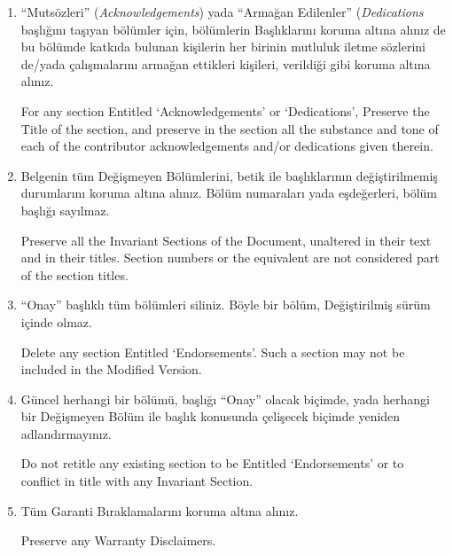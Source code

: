 \begin{multicols}{2}
\begin{enumerate}
\item %
“Mutsözleri” (\emph{Acknowledgements}) yada “Armağan Edilenler” (\emph{Dedications} başlığını taşıyan bölümler için, bölümlerin Başlıklarını koruma altına alınız de bu bölümde katkıda bulunan kişilerin her birinin mutluluk iletme sözlerini de/yada çalışmalarını armağan ettikleri kişileri, verildiği gibi koruma altına alınız.

\begin{ingliz}For any section Entitled
`Acknowledgements' or
`Dedications', Preserve the Title of the
section, and preserve in the section all the substance and
tone of each of the contributor acknowledgements and/or
dedications given therein.\end{ingliz}

\item Belgenin tüm Değişmeyen Bölümlerini, betik ile başlıklarının değiştirilmemiş durumlarını koruma altına alınız. Bölüm numaraları yada eşdeğerleri, bölüm başlığı sayılmaz. 

\begin{ingliz}Preserve all the Invariant Sections of the
Document, unaltered in their text and in their titles.
Section numbers or the equivalent are not considered part
of the section titles.\end{ingliz}        

\item “Onay” başlıklı tüm bölümleri siliniz. Böyle bir bölüm, Değiştirilmiş sürüm içinde olmaz.
\begin{ingliz}Delete any section Entitled
`Endorsements'. Such a section may not be
included in the Modified Version.\end{ingliz}

\item Güncel herhangi bir bölümü, başlığı “Onay” olacak biçimde, yada herhangi bir Değişmeyen Bölüm ile başlık konusunda çelişecek biçimde yeniden adlandırmayınız. 
\begin{ingliz} Do not retitle any existing section to be
Entitled `Endorsements' or to conflict in
title with any Invariant Section.\end{ingliz}

\item Tüm Garanti Bıraklamalarını koruma altına alınız.
\begin{ingliz}Preserve any Warranty Disclaimers.\end{ingliz}
\end{enumerate}


\end{multicols}
